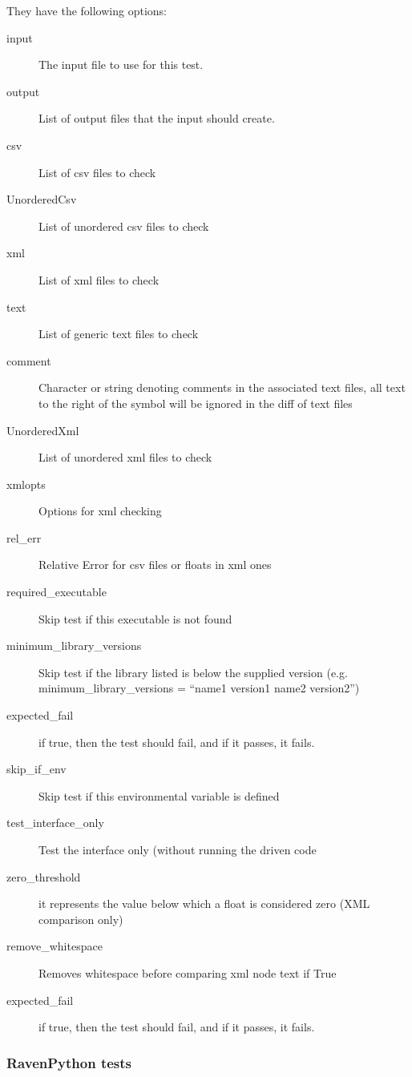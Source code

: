 \documentclass{article}
\begin{document}
They have the following options:

\begin{description}
    \item[input] The input file to use for this test.
    \item[output] List of output files that the input should create.
    \item[csv] List of csv files to check
    \item[UnorderedCsv] List of unordered csv files to check
    \item[xml] List of xml files to check
    \item[text] List of generic text files to check
    \item[comment] Character or string denoting comments in the associated text files, all text to the right of the symbol will be ignored in the diff of text files
    \item[UnorderedXml] List of unordered xml files to check
    \item[xmlopts] Options for xml checking
    \item[rel\_err] Relative Error for csv files or floats in xml ones
    \item[required\_executable] Skip test if this executable is not found
    \item[minimum\_library\_versions] Skip test if the library listed is below the supplied version (e.g. minimum\_library\_versions = ``name1 version1 name2 version2'')
    \item[expected\_fail] if true, then the test should fail, and if it passes, it fails.
    \item[skip\_if\_env] Skip test if this environmental variable is defined
    \item[test\_interface\_only] Test the interface only (without running the driven code
    \item[zero\_threshold] it represents the value below which a float is considered zero (XML comparison only)
    \item[remove\_whitespace] Removes whitespace before comparing xml node text if True
    \item[expected\_fail] if true, then the test should fail, and if it passes, it fails.
\end{description}

\subsubsection{RavenPython tests}
\end{document}
